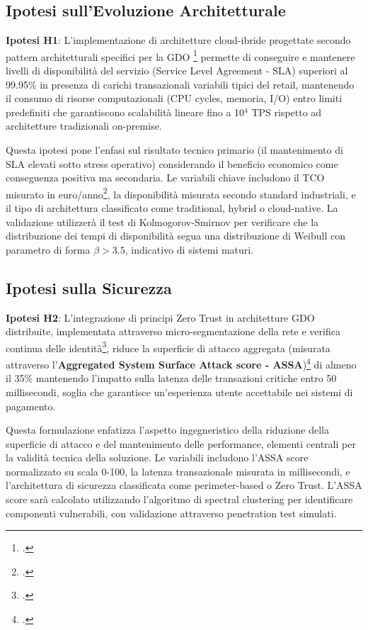 \subsection{\texorpdfstring{\textbf{Ipotesi sull'Evoluzione
Architetturale}}{1.4.1 Ipotesi sull'Evoluzione Architetturale}}\label{ipotesi-sullevoluzione-architetturale}

\textbf{Ipotesi H1}: L'implementazione di architetture cloud-ibride progettate
secondo pattern architetturali specifici per la GDO \footcite{yang2024hybrid} permette di
conseguire e mantenere livelli di disponibilità del servizio (Service Level Agreement - SLA) superiori al 99.95\% in presenza di carichi transazionali variabili tipici del retail, mantenendo il consumo di risorse computazionali (CPU cycles, memoria, I/O) entro limiti predefiniti che garantiscono scalabilità lineare fino a 10$^4$ TPS rispetto ad architetture tradizionali on-premise.

Questa ipotesi pone l'enfasi sul risultato tecnico primario (il
mantenimento di SLA elevati sotto stress operativo) considerando il beneficio economico come conseguenza positiva ma secondaria. Le
variabili chiave includono il TCO misurato in euro/anno\footcite{forrester2024tei}, la disponibilità misurata secondo standard industriali, e il tipo di architettura classificato come traditional, hybrid o cloud-native.
La validazione utilizzerà il test di Kolmogorov-Smirnov per verificare che la distribuzione dei tempi di disponibilità segua una distribuzione di Weibull con parametro di forma $\beta > 3.5$, indicativo di sistemi maturi.

\subsection{\texorpdfstring{\textbf{Ipotesi sulla
Sicurezza}}{1.4.2 Ipotesi sulla Sicurezza}}\label{ipotesi-sulla-sicurezza}

\textbf{Ipotesi H2}: L'integrazione di principi Zero Trust in architetture GDO distribuite, implementata attraverso micro-segmentazione della rete e verifica continua delle identità\footcite{chen2023zero}, riduce la superficie di attacco aggregata (misurata attraverso l'\textbf{Aggregated System Surface Attack score - ASSA})\footcite{anderson2024epidemiological} di almeno il 35\% mantenendo l'impatto sulla latenza delle transazioni critiche entro 50 millisecondi, soglia che garantisce un'esperienza utente accettabile nei sistemi di pagamento.

Questa formulazione enfatizza l'aspetto ingegneristico della riduzione della superficie di attacco e del mantenimento delle performance, elementi centrali per la validità tecnica della soluzione. Le variabili includono l'ASSA score normalizzato su scala 0-100, la latenza transazionale misurata in millisecondi, e l'architettura di sicurezza classificata come perimeter-based o Zero Trust.
L'ASSA score sarà calcolato utilizzando l'algoritmo di spectral clustering per identificare componenti vulnerabili, con validazione attraverso penetration test simulati.

